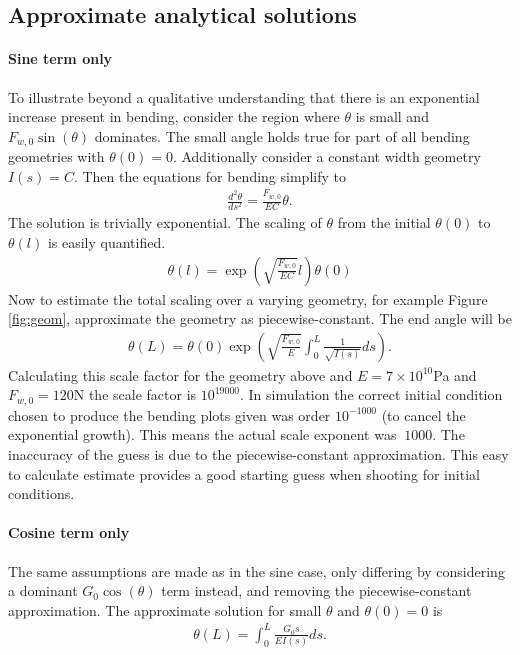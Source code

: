 \documentclass[12pt,reqno]{article}
\begin{document}
	\subsection{Approximate analytical solutions}
		\paragraph{Sine term only}
	To illustrate beyond a qualitative understanding that there is an exponential increase present in bending, consider the region where $\theta$ is small and $F_{w,0}\sin(\theta)$ dominates. The small angle holds true for part of all bending geometries with $\theta(0) = 0$. Additionally consider a constant width geometry $I(s) = C$. Then the equations for bending simplify to 
	\begin{align}
		\frac{d^{2}\theta}{ds^{2}} = \frac{F_{w,0}}{EC}\theta.
	\end{align}
	The solution is trivially exponential. The scaling of $\theta$ from the initial $\theta(0)$ to $\theta(l)$ is easily quantified.
	\begin{align}
		\theta(l) = \exp({\sqrt{\frac{F_{w,0}}{EC}}l})\theta(0)
	\end{align}
	Now to estimate the total scaling over a varying geometry, for example Figure \ref{fig:geom}, approximate the geometry as piecewise-constant. The end angle will be
	\begin{align}
		\theta(L) = \theta(0) \exp({\sqrt{\frac{F_{w,0}}{E}}}\int_{0}^{L}\frac{1}{\sqrt{I(s)}}ds).
	\end{align}
	Calculating this scale factor for the geometry above and $E = 7\times 10^{10}$Pa and $F_{w,0}=120$N the scale factor is $10^{19000}$. In simulation the correct initial condition chosen to produce the bending plots given was order $10^{-1000}$ (to cancel the exponential growth). This means the actual scale exponent was $~1000$. The inaccuracy of the guess is due to the piecewise-constant approximation. This easy to calculate estimate provides a good starting guess when shooting for initial conditions. 
	
	\paragraph{Cosine term only} The same assumptions are made as in the sine case, only differing by considering a dominant $G_{0}\cos(\theta)$ term instead, and removing the piecewise-constant approximation. The approximate solution for small $\theta$ and $\theta(0) = 0$ is
	\begin{align}
		\theta(L) = \int_{0}^{L} \frac{G_{0}s}{EI(s)} ds.	
	\end{align}
\end{document}
